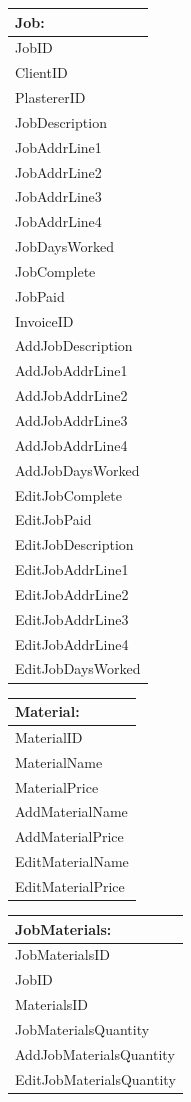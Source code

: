 \begin{tabular}{|p{5cm}|}
	\hline
	\textbf{Job:} \\ \hline
		JobID \\
		ClientID \\
		PlastererID \\
		JobDescription \\
		JobAddrLine1 \\
		JobAddrLine2 \\
		JobAddrLine3 \\
		JobAddrLine4 \\
		JobDaysWorked \\
		JobComplete \\
		JobPaid \\ 
		InvoiceID \\ \hline
		AddJobDescription\\
		AddJobAddrLine1 \\
		AddJobAddrLine2 \\
		AddJobAddrLine3 \\
		AddJobAddrLine4 \\
		AddJobDaysWorked \\
		EditJobComplete \\
		EditJobPaid \\
		EditJobDescription\\
		EditJobAddrLine1 \\
		EditJobAddrLine2 \\
		EditJobAddrLine3 \\
		EditJobAddrLine4 \\
		EditJobDaysWorked \\ \hline
\end{tabular}

\begin{tabular}{|p{5cm}|}
	\hline
	\textbf{Material:} \\ \hline
		MaterialID \\
		MaterialName \\
		MaterialPrice \\ \hline
		AddMaterialName\\
		AddMaterialPrice \\ \hline	
		EditMaterialName \\
		EditMaterialPrice \\ \hline
\end{tabular}

\begin{tabular}{|p{5cm}|}
	\hline
	\textbf{JobMaterials:} \\ \hline
		JobMaterialsID \\
		JobID \\
		MaterialsID \\ 
		JobMaterialsQuantity \\ \hline
		AddJobMaterialsQuantity \\
		EditJobMaterialsQuantity \\ \hline
\end{tabular}


